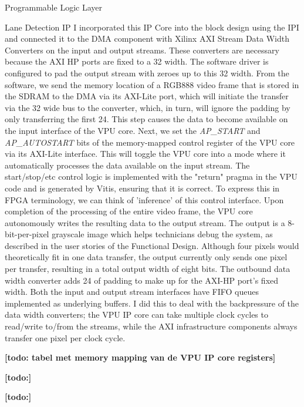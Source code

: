 \documentclass{matthijs}
\begin{document}
\begin{hoofdstuk}{Programmable Logic Layer}
\begin{paragraaf}{Lane Detection IP}
			I incorporated this IP Core into the block design using the IPI and connected it to the DMA component with Xilinx AXI Stream Data Width Converters on the input and output streams.
			These converters are necessary because the AXI HP ports are fixed to a \qty{32}{\bit} width.
			The software driver is configured to pad the output stream with zeroes up to this \qty{32}{\bit} width.
			From the software, we send the memory location of a RGB888 video frame that is stored in the SDRAM to the DMA via its AXI-Lite port, which will initiate the transfer via the \qty{32}{\bit} wide bus to the converter, which, in turn, will ignore the padding by only transferring the first \qty{24}{\bit}.
			This step causes the data to become available on the input interface of the VPU core.
			Next, we set the \textit{AP\_START} and \textit{AP\_AUTOSTART} bits of the memory-mapped control register of the VPU core via its AXI-Lite interface.
			This will toggle the VPU core into a mode where it automatically processes the data available on the input stream.
			The start/stop/etc control logic is implemented with the "return" pragma in the VPU code and is generated by Vitis, ensuring that it is correct.
			To express this in FPGA terminology, we can think of 'inference' of this control interface.
			Upon completion of the processing of the entire video frame, the VPU core autonomously writes the resulting data to the output stream.
			The output is a 8-bit-per-pixel grayscale image which helps technicians debug the system, as described in the user stories of the Functional Design.
			Although four pixels would theoretically fit in one data transfer, the output currently only sends one pixel per transfer, resulting in a total output width of eight bits.
			The outbound data width converter adds \qty{24}{\bit} of padding to make up for the AXI-HP port's fixed width.
			Both the input and output stream interfaces have FIFO queues implemented as underlying buffers.
			I did this to deal with the backpressure of the data width converters; the VPU IP core can take multiple clock cycles to read/write to/from the streams, while the AXI infrastructure components always transfer one pixel per clock cycle.

			\textbf{[todo: tabel met memory mapping van de VPU IP core registers]}

			\textbf{[todo:]}

		\end{paragraaf}

		\textbf{[todo:]}

	\end{hoofdstuk}
\end{document}
